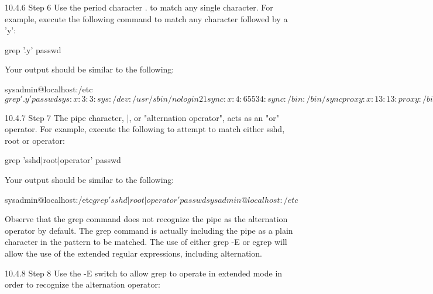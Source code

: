 10.4.6 Step 6
Use the period character . to match any single character. For example, execute the following
command to match any character followed by a 'y':

grep '.y' passwd

Your output should be similar to the following:

sysadmin@localhost:/etc$ grep '.y' passwd

sys:x:3:3:sys:/dev:/usr/sbin/nologin

21



sync:x:4:65534:sync:/bin:/bin/sync

proxy:x:13:13:proxy:/bin:/usr/sbin/nologin

gnats:x:41:41:Gnats Bug-Reporting System (admin):/var/lib/gnats:/usr/sbin/nologi

n

nobody:x:65534:65534:nobody:/nonexistent:/usr/sbin/nologin

systemd-network:x:101:102:systemd Network Management,,,:/run/systemd/netif:/usr/

sbin/nologin

systemd-resolve:x:102:103:systemd Resolver,,,:/run/systemd/resolve:/usr/sbin/nol

ogin

syslog:x:103:106::/home/syslog:/usr/sbin/nologin

sysadmin:x:1001:1001:System Administrator,,,,:/home/sysadmin:/bin/bash

sysadmin@localhost:/etc$

10.4.7 Step 7
The pipe character, |, or "alternation operator", acts as an "or" operator. For example, execute
the following to attempt to match either sshd, root or operator:

grep 'sshd|root|operator' passwd

Your output should be similar to the following:

sysadmin@localhost:/etc$ grep 'sshd|root|operator' passwd

sysadmin@localhost:/etc$

Observe that the grep command does not recognize the pipe as the alternation operator by
default. The grep command is actually including the pipe as a plain character in the pattern to be
matched. The use of either grep -E or egrep will allow the use of the extended regular
expressions, including alternation.

10.4.8 Step 8
Use the -E switch to allow grep to operate in extended mode in order to recognize the
alternation operator:

